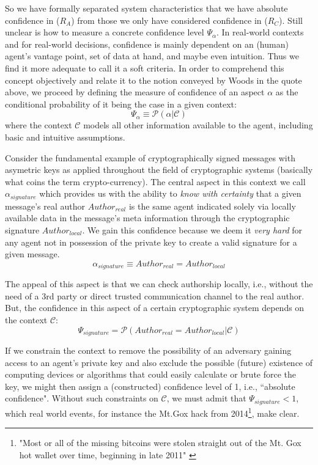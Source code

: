 \documentclass[twocolumn,showpacs,%
  nofootinbib,aps,superscriptaddress,%
  eqsecnum,prd,notitlepage,showkeys,10pt]{revtex4-1}
\begin{document}
So we have formally separated system characteristics that we have absolute confidence in ($R_A$) from those we only have considered confidence in ($R_C$). Still unclear is how to measure a concrete confidence level $\Psi_\alpha$. In real-world contexts and for real-world decisions, confidence is mainly dependent on an (human) agent's vantage point, set of data at hand, and maybe even intuition. Thus we find it more adequate to call it a soft criteria. In order to comprehend this concept objectively and relate it to the notion conveyed by Woods in the quote above, we proceed by defining the measure of confidence of an aspect $\alpha$ as the conditional probability of it being the case in a given context:
\begin{equation}
\Psi_\alpha \equiv \mathcal{P}(\alpha | \mathcal{C})
\end{equation}
where the context $\mathcal{C}$ models all other information available to the agent, including basic and intuitive assumptions.

Consider the fundamental example of cryptographically signed messages with asymetric keys as applied throughout the field of cryptographic systems (basically what coins the term crypto-currency). The central aspect in this context
we call $\alpha_{signature}$ which provides us with the ability to \textit{know with certainty} that a given message's real author $Author_{real}$ is the same agent indicated solely via locally available data in the message's meta information through the cryptographic signature $Author_{local}$. We gain this confidence because we deem it \textit{very hard} for any agent not in possession of the private key to create a valid signature for a given message.
\begin{equation}
\alpha_{signature} \equiv Author_{real} = Author_{local}
\end{equation}

The appeal of this aspect is that we can check authorship locally, i.e., without the need of a 3rd party or direct trusted communication channel to the real author.
But, the confidence in this aspect of a certain cryptographic system depends on the context $\mathcal{C}$:
\begin{equation}
\Psi_{signature} = \mathcal{P}(Author_{real} = Author_{local} | \mathcal{C})
\end{equation}

If we constrain the context to remove the possibility of an adversary gaining access to an agent's private key and also exclude the possible (future) existence of computing devices or algorithms that could easily calculate or brute force the key, we might then assign a (constructed) confidence level of 1, i.e., ``absolute confidence". Without such constraints on $\mathcal{C}$, we must admit that $\Psi_{signature}<1$, which real world events, for instance the Mt.Gox hack from 2014\footnote{"Most or all of the missing bitcoins were stolen straight out of the Mt. Gox hot wallet over time, beginning in late 2011" \cite{mt-gox}}, make clear.
\end{document}
